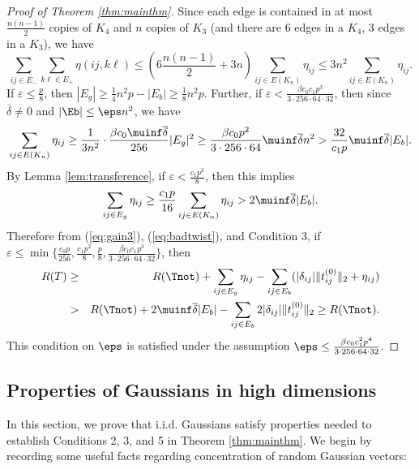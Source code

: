 \begin{proof}[Proof of Theorem \ref{thm:mainthm}]
Since each edge is contained in at most $\frac{n(n-1)}{2}$
copies of $K_{4}$ and $n$ copies of $K_{3}$ (and there are 6 edges
in a $K_{4}$, 3 edges in a $K_3$), we have 
\[
	\sum_{ij\in E_{-}}\sum_{k\ell\in E_{+}}\eta(ij,k\ell)
	\le\left(6\frac{n(n-1)}{2}+3n\right)\sum_{ij\in E(K_{n})}\eta_{ij}\le3n^{2}\sum_{ij\in E(K_{n})}\eta_{ij}.
\]
If $\varepsilon \le \frac{p}{8}$, then $|E_{g}|\ge \frac{1}{4}n^{2}p-|E_{b}| \ge\frac{1}{8}n^{2}p$.
Further, if $\varepsilon < \frac{\beta c_0 c_1 p^3}{3 \cdot 256 \cdot 64 \cdot 32}$, then since $\bar{\delta} \neq 0$ and $|\Eb| \leq \eps n^2$, we have
\[
	\sum_{ij\in E(K_{n})}\eta_{ij}
	\ge\frac{1}{3n^{2}}\cdot\frac{\beta c_{0} \muinf \overline{\delta}}{256} |E_{g}|^2
	\ge\frac{\beta c_{0} p^2}{3\cdot 256 \cdot 64}\muinf \overline{\delta} n^2
	>\frac{32}{c_{1}p}\muinf\overline{\delta}|E_{b}|.
\]
By Lemma \ref{lem:transference}, if $\varepsilon < \frac{c_1p^2}{8}$, then this implies 
\[
\sum_{ij\in E_{g}}\eta_{ij}\ge\frac{c_{1}p}{16}\sum_{ij\in E(K_{n})}\eta_{ij} > 2\muinf\overline{\delta}|E_{b}|.
\]
Therefore from (\ref{eq:gain3}), (\ref{eq:badtwist}), and Condition 3, 
if $\varepsilon \le \min\{\frac{c_0 p}{256}, \frac{c_1p^2}{8}, \frac{p}{8}, \frac{\beta c_0 c_1 p^3}{3 \cdot 256 \cdot 64 \cdot 32} \} $, then
\begin{eqnarray*}
R(T) & \ge & R(\Tnot)+\sum_{ij\in E_{g}}\eta_{ij}-\sum_{ij\in E_{b}}(|\delta_{ij}|\|t_{ij}^{(0)}\|_2+\eta_{ij})\\
 & > & R(\Tnot)+2\muinf\overline{\delta}|E_{b}|-\sum_{ij\in E_{b}}2|\delta_{ij}|\|t_{ij}^{(0)}\|_2\ge R(\Tnot).
\end{eqnarray*}
This condition on $\eps$ is satisfied under the assumption $\eps \leq \frac{\beta c_0 c_1^2 p^4}{3\cdot 256 \cdot 64 \cdot 32}$.
\end{proof}









\subsection{Properties of Gaussians in high dimensions} \label{sec-gaussians-well-distributed}

In this section, we prove that i.i.d. Gaussians satisfy properties needed to establish Conditions 2, 3, and 5 in Theorem \ref{thm:mainthm}. We begin by recording some useful facts regarding concentration of random Gaussian vectors:

